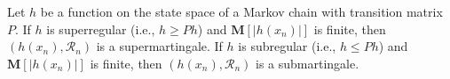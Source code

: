 Let $h$ be a function on the state space of a Markov chain with transition matrix $P$. If $h$ is superregular (i.e., $h \geq Ph$) and $\mathbf{M}[|h(x_n)|]$ is finite, then $(h(x_n), \mathcal{R}_n)$ is a supermartingale. If $h$ is subregular (i.e., $h \leq Ph$) and $\mathbf{M}[|h(x_n)|]$ is finite, then $(h(x_n), \mathcal{R}_n)$ is a submartingale.
